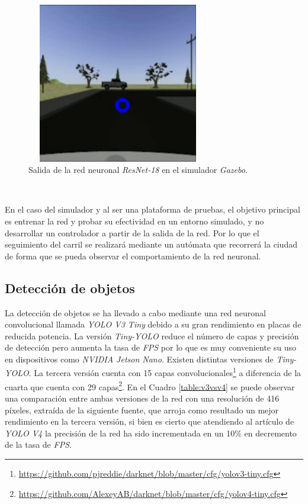 \begin{figure} [h!]
	\begin{center}
		\includegraphics[width=8cm, height=7cm]{figs/outputNNsim}
	\end{center}
	\caption{Salida de la red neuronal \textit{ResNet-18} en el simulador \textit{Gazebo}.}
	\label{fig:outputnnsim}
\end{figure}\

En el caso del simulador y al ser una plataforma de pruebas, el objetivo principal es entrenar la red y probar su efectividad en un entorno simulado, y no desarrollar un controlador a partir de la salida de la red. Por lo que el seguimiento del carril se realizará mediante un autómata que recorrerá la ciudad de forma que se pueda observar el comportamiento de la red neuronal.\\

\subsection{Detección de objetos}
\label{subsection:objectdetector}
La detección de objetos se ha llevado a cabo mediante una red neuronal convolucional llamada \textit{YOLO V3 Tiny} debido a su gran rendimiento en placas de reducida potencia. La versión \textit{Tiny-YOLO} reduce el número de capas y precisión de detección pero aumenta la tasa de \textit{FPS} por lo que es muy conveniente su uso en dispositivos como \textit{NVIDIA Jetson Nano}. Existen distintas versiones de \textit{Tiny-YOLO}. La tercera versión cuenta con 15 capas convolucionales\footnote{\url{https://github.com/pjreddie/darknet/blob/master/cfg/yolov3-tiny.cfg}} a diferencia de la cuarta que cuenta con 29 capas\footnote{\url{https://github.com/AlexeyAB/darknet/blob/master/cfg/yolov4-tiny.cfg}}. En el Cuadro \ref{table:v3vsv4} se puede observar una comparación entre ambas versiones de la red con una resolución de 416 píxeles, extraída de la siguiente fuente\cite{versus}, que arroja como resultado un mejor rendimiento en la tercera versión, si bien es cierto que atendiendo al artículo de \textit{YOLO V4} \cite{yolov4} la precisión de la red ha sido incrementada en un 10\% en decremento de la tasa de \textit{FPS}.\\

